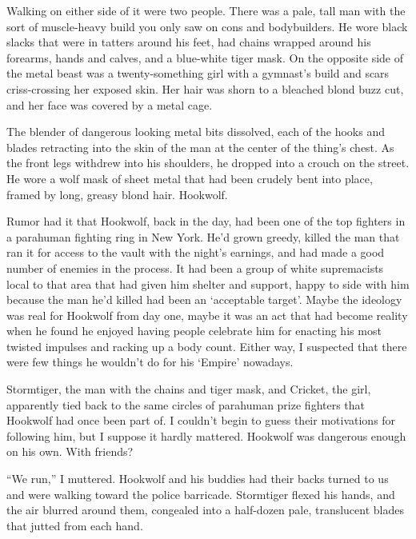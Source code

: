 Walking on either side of it were two people.  There was a pale, tall man with the sort of muscle-heavy build you only saw on cons and bodybuilders.  He wore black slacks that were in tatters around his feet, had chains wrapped around his forearms, hands and calves, and a blue-white tiger mask.  On the opposite side of the metal beast was a twenty-something girl with a gymnast's build and scars criss-crossing her exposed skin.  Her hair was shorn to a bleached blond buzz cut, and her face was covered by a metal cage.



The blender of dangerous looking metal bits dissolved, each of the hooks and blades retracting into the skin of the man at the center of the thing's chest.  As the front legs withdrew into his shoulders, he dropped into a crouch on the street.  He wore a wolf mask of sheet metal that had been crudely bent into place, framed by long, greasy blond hair.  Hookwolf.



Rumor had it that Hookwolf, back in the day, had been one of the top fighters in a parahuman fighting ring in New York.  He'd grown greedy, killed the man that ran it for access to the vault with the night's earnings, and had made a good number of enemies in the process.  It had been a group of white supremacists local to that area that had given him shelter and support, happy to side with him because the man he'd killed had been an `acceptable target'.  Maybe the ideology was real for Hookwolf from day one, maybe it was an act that had become reality when he found he enjoyed having people celebrate him for enacting his most twisted impulses and racking up a body count.  Either way, I suspected that  there were few things he wouldn't do for his `Empire' nowadays.



Stormtiger, the man with the chains and tiger mask, and Cricket, the girl, apparently tied back to the same circles of parahuman prize fighters that Hookwolf had once been part of.  I couldn't begin to guess their motivations for following him, but I suppose it hardly mattered.  Hookwolf was dangerous enough on his own.  With friends?



``We run,'' I muttered.  Hookwolf and his buddies had their backs turned to us and were walking toward the police barricade.  Stormtiger flexed his hands, and the air blurred around them, congealed into a half-dozen pale, translucent blades that jutted from each hand.



